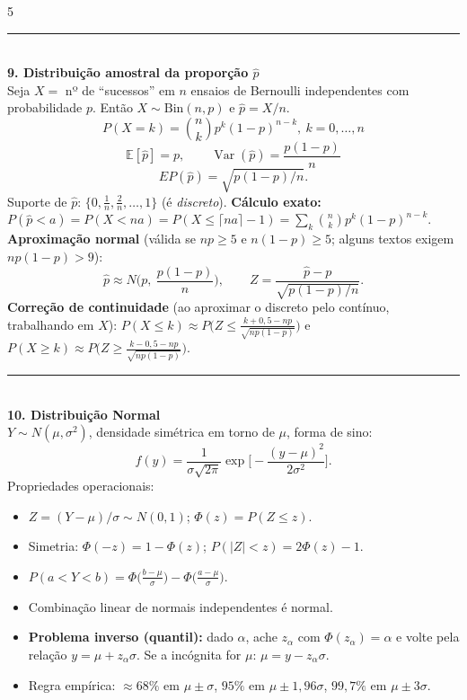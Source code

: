 \documentclass[a4paper,8pt]{extarticle}
\newcommand{\tit}[1]{\vspace{2pt}\textcolor{azul}{\rule{\linewidth}{0.6pt}}\\[1pt]\textbf{\textcolor{azul}{#1}}\\[1pt]}
\newcommand{\E}{\mathbb{E}}
\newcommand{\Var}{\operatorname{Var}}
\begin{document}
\begin{multicols*}{5}
\tit{9. Distribuição amostral da proporção $\hat p$}
Seja $X=$ nº de “sucessos” em $n$ ensaios de Bernoulli independentes com probabilidade $p$. Então $X\sim \text{Bin}(n,p)$ e $\hat p = X/n$.
\[P(X=k)=\binom{n}{k}p^k(1-p)^{n-k},\ k=0,\dots,n\]
\[\E[\hat p]=p,\qquad \Var(\hat p)=\frac{p(1-p)}{n}\]
\[EP(\hat p)=\sqrt{p(1-p)/n}.\]
Suporte de $\hat p$: $\{0,\tfrac1n,\tfrac2n,\dots,1\}$ (é \emph{discreto}).
\textbf{Cálculo exato:} $P(\hat p<a)=P(X<na)=P(X\le \lceil na\rceil-1)=\sum_{k}\binom{n}{k}p^k(1-p)^{n-k}$.
\textbf{Aproximação normal} (válida se $np\ge5$ e $n(1-p)\ge5$; alguns textos exigem $np(1-p)>9$):
\[\hat p \approx N\!\Big(p,\ \frac{p(1-p)}{n}\Big),\qquad Z=\frac{\hat p-p}{\sqrt{p(1-p)/n}} .\]
\textbf{Correção de continuidade} (ao aproximar o discreto pelo contínuo, trabalhando em $X$): $P(X\le k)\approx P\big(Z\le \frac{k+0{,}5-np}{\sqrt{np(1-p)}}\big)$ e $P(X\ge k)\approx P\big(Z\ge \frac{k-0{,}5-np}{\sqrt{np(1-p)}}\big)$.

\tit{10. Distribuição Normal}
$Y\sim N(\mu,\sigma^2)$, densidade simétrica em torno de $\mu$, forma de sino:
\[f(y)=\frac{1}{\sigma\sqrt{2\pi}}\exp\!\Big[-\frac{(y-\mu)^2}{2\sigma^2}\Big].\]
Propriedades operacionais:
\begin{itemize}
\item $Z=(Y-\mu)/\sigma\sim N(0,1)$; $\Phi(z)=P(Z\le z)$.
\item Simetria: $\Phi(-z)=1-\Phi(z)$; $P(|Z|<z)=2\Phi(z)-1$.
\item $P(a<Y<b)=\Phi\!\big(\frac{b-\mu}{\sigma}\big)-\Phi\!\big(\frac{a-\mu}{\sigma}\big)$.
\item Combinação linear de normais independentes é normal.
\item \textbf{Problema inverso (quantil):} dado $\alpha$, ache $z_\alpha$ com $\Phi(z_\alpha)=\alpha$ e volte pela relação $y=\mu+z_\alpha\sigma$. Se a incógnita for $\mu$: $\mu=y-z_\alpha\sigma$.
\item Regra empírica: $\approx68\%$ em $\mu\pm\sigma$, $95\%$ em $\mu\pm1{,}96\sigma$, $99{,}7\%$ em $\mu\pm3\sigma$.
\end{itemize}


\end{multicols*}
\end{document}
